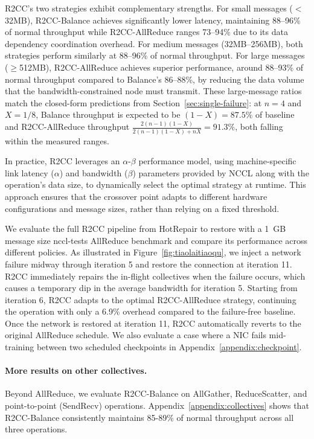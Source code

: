 R2CC's two strategies exhibit complementary strengths. For small messages ($<$32MB), R2CC-Balance achieves significantly lower latency, maintaining 88--96\% of normal throughput while R2CC-AllReduce ranges 73--94\% due to its data dependency coordination overhead. For medium messages (32MB--256MB), both strategies perform similarly at 88--96\% of normal throughput. For large messages ($\geq$512MB), R2CC-AllReduce achieves superior performance, around 88--93\% of normal throughput compared to Balance's 86--88\%, by reducing the data volume that the bandwidth-constrained node must transmit. These large-message ratios match the closed-form predictions from Section~\ref{sec:single-failure}: at $n = 4$ and $X = 1/8$, Balance throughput is expected to be $(1-X) = 87.5\%$ of baseline and R2CC-AllReduce throughput $\frac{2(n-1)(1-X)}{2(n-1)(1-X)+nX} = 91.3\%$, both falling within the measured ranges.

In practice, R2CC leverages an $\alpha$-$\beta$ performance model, using machine-specific link latency ($\alpha$) and bandwidth ($\beta$) parameters provided by NCCL along with the operation's data size, to dynamically select the optimal strategy at runtime. This approach ensures that the crossover point adapts to different hardware configurations and message sizes, rather than relying on a fixed threshold.

We evaluate the full R2CC pipeline from HotRepair to restore with a 1~GB message size nccl-tests AllReduce benchmark and compare its performance across different policies. As illustrated in Figure~\ref{fig:tiaolaitiaoqu}, we inject a network failure midway through iteration 5 and restore the connection at iteration 11. R2CC immediately repairs the in-flight collectives when the failure occurs, which causes a temporary dip in the average bandwidth for iteration 5. Starting from iteration 6, R2CC adapts to the optimal R2CC-AllReduce strategy, continuing the operation with only a 6.9\% overhead compared to the failure-free baseline. Once the network is restored at iteration 11, R2CC automatically reverts to the original AllReduce schedule. We also evaluate a case where a NIC fails mid-training between two scheduled checkpoints in Appendix~\ref{appendix:checkpoint}.

\paragraph{More results on other collectives.} Beyond AllReduce, we evaluate R2CC-Balance on AllGather, ReduceScatter, and point-to-point (SendRecv) operations. Appendix~\ref{appendix:collectives} shows that R2CC-Balance consistently maintains 85-89\% of normal throughput across all three operations.


